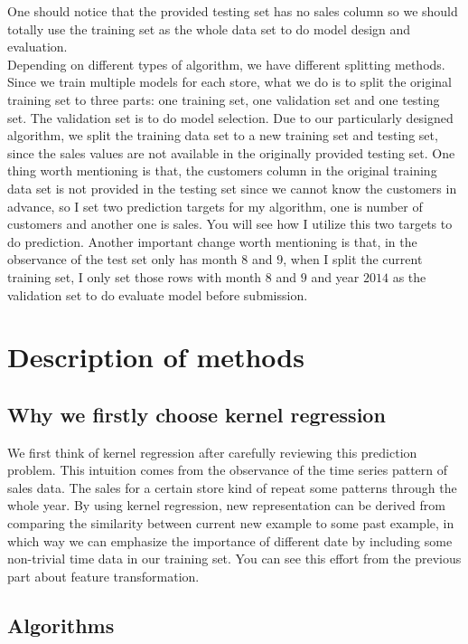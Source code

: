\documentclass[11pt]{article}
\begin{document}
One should notice that the provided testing set has no sales column so we should totally use the training set as the whole data set to do model design and evaluation. 
\\

Depending on different types of algorithm, we have different splitting methods. Since we train multiple models for each store, what we do is to split the original training set to three parts: one training set, one validation set and one testing set. The validation set is to do model selection. Due to our particularly designed algorithm, we split the training data set to a new training set and testing set, since the sales values are not available in the originally provided testing set. One thing worth mentioning is that, the customers column in the original training data set is not provided in the testing set since we cannot know the customers in advance, so I set two prediction targets for my algorithm, one is number of customers and another one is sales. You will see how I utilize this two targets to do prediction. Another important change worth mentioning is that, in the observance of the test set only has month $8$ and $9$, when I split the current training set, I only set those rows with month $8$ and $9$ and year $2014$ as the validation set to do evaluate model before submission. 

\section{Description of methods}

\subsection{Why we firstly choose kernel regression}

We first think of kernel regression after carefully reviewing this prediction problem. This intuition comes from the observance of the time series pattern of sales data. The sales for a certain store kind of repeat some patterns through the whole year. By using kernel regression, new representation can be derived from comparing the similarity between current new example to some past example, in which way we can emphasize the importance of different date by including some non-trivial time data in our training set. You can see this effort from the previous part about feature transformation.  

\subsection{Algorithms}
\end{document}
